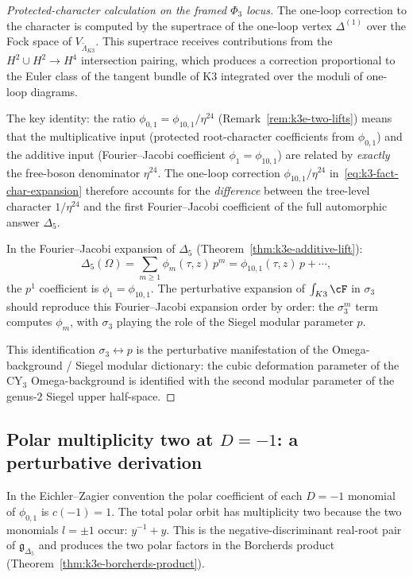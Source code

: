 \begin{proof}[Protected-character calculation on the framed \(\Phi_3\) locus]
The one-loop correction to the character is computed by the
supertrace of the one-loop vertex $\Delta^{(1)}$ over the Fock
space of $V_{\widetilde{\Lambda}_{K3}}$. This supertrace receives
contributions from the $H^2 \cup H^2 \to H^4$ intersection
pairing, which produces a correction proportional to the
Euler class of the tangent bundle of K3 integrated over the
moduli of one-loop diagrams.

The key identity: the ratio $\phi_{0,1} = \phi_{10,1}/\eta^{24}$
(Remark~\ref{rem:k3e-two-lifts}) means that the multiplicative
input (protected root-character coefficients from $\phi_{0,1}$) and the additive
input (Fourier--Jacobi coefficient $\phi_1 = \phi_{10,1}$) are
related by \emph{exactly} the free-boson denominator
$\eta^{24}$. The one-loop correction $\phi_{10,1}/\eta^{24}$
in~\eqref{eq:k3-fact-char-expansion} therefore accounts for the
\emph{difference} between the tree-level character
$1/\eta^{24}$ and the first Fourier--Jacobi coefficient of the
full automorphic answer $\Delta_5$.

In the Fourier--Jacobi expansion of $\Delta_5$
(Theorem~\ref{thm:k3e-additive-lift}):
\[
 \Delta_5(\Omega)
 = \sum_{m \geq 1} \phi_m(\tau, z)\, p^m
 = \phi_{10,1}(\tau, z)\, p + \cdots,
\]
the $p^1$ coefficient is $\phi_1 = \phi_{10,1}$. The
perturbative expansion of $\int_{K3} \cF$ in $\sigma_3$ should
reproduce this Fourier--Jacobi expansion order by order:
the $\sigma_3^m$ term computes $\phi_m$, with $\sigma_3$
playing the role of the Siegel modular parameter $p$.

This identification $\sigma_3 \leftrightarrow p$ is the
perturbative manifestation of the Omega-background / Siegel
modular dictionary: the cubic deformation parameter of the
CY$_3$ Omega-background is identified with the second modular
parameter of the genus-$2$ Siegel upper half-space.
\end{proof}

\subsection{Polar multiplicity two at \texorpdfstring{$D=-1$}{D=-1}: a perturbative derivation}
\label{subsec:k3-fact-c-minus-1}

In the Eichler--Zagier convention the polar coefficient of each
$D=-1$ monomial of $\phi_{0,1}$ is $c(-1)=1$. The total polar orbit
has multiplicity two because the two monomials $l=\pm1$ occur:
$y^{-1}+y$. This is the negative-discriminant real-root pair of
$\mathfrak{g}_{\Delta_5}$ and produces the two polar factors in the
Borcherds product (Theorem~\ref{thm:k3e-borcherds-product}).

